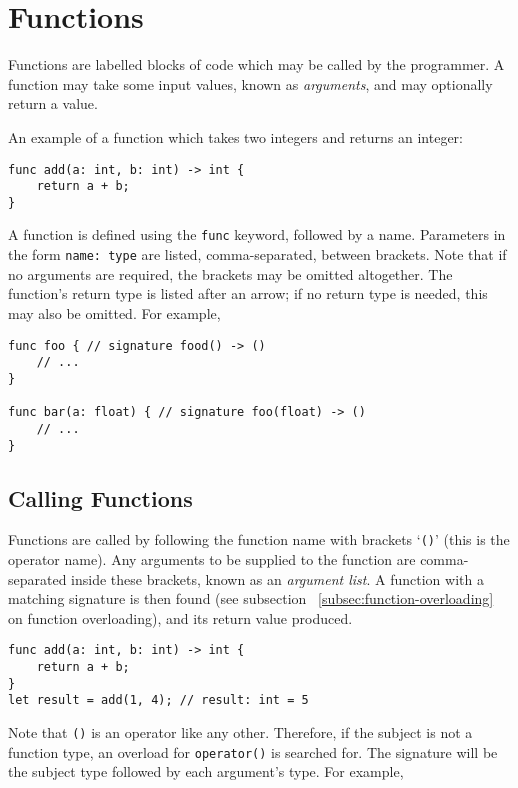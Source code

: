 \section{Functions}\label{sec:functions}

Functions are labelled blocks of code which may be called by the programmer.
A function may take some input values, known as \textit{arguments}, and may optionally return a value.

An example of a function which takes two integers and returns an integer:
\begin{lstlisting}[language=CustomLang]
func add(a: int, b: int) -> int {
    return a + b;
}
\end{lstlisting}

A function is defined using the \texttt{func} keyword, followed by a name.
Parameters in the form \texttt{name: type} are listed, comma-separated, between brackets.
Note that if no arguments are required, the brackets may be omitted altogether.
The function's return type is listed after an arrow; if no return type is needed, this may also be omitted.
For example,
\begin{lstlisting}[language=CustomLang]
func foo { // signature food() -> ()
    // ...
}

func bar(a: float) { // signature foo(float) -> ()
    // ...
}
\end{lstlisting}

\subsection{Calling Functions}

Functions are called by following the function name with brackets `\texttt{()}' (this is the operator name).
Any arguments to be supplied to the function are comma-separated inside these brackets, known as an \textit{argument list}.
A function with a matching signature is then found (see subsection ~\ref{subsec:function-overloading} on function overloading), and its return value produced.

\begin{lstlisting}[language=CustomLang]
func add(a: int, b: int) -> int {
    return a + b;
}
let result = add(1, 4); // result: int = 5
\end{lstlisting}

Note that \texttt{()} is an operator like any other.
Therefore, if the subject is not a function type, an overload for \texttt{operator()} is searched for.
The signature will be the subject type followed by each argument's type.
For example,

